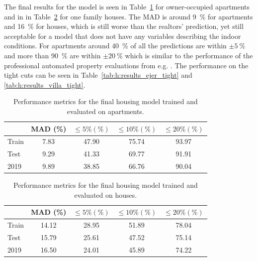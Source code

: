 The final results for the model is seen in Table~\ref{tab:h:results_ejer} for owner-occupied apartments and in in Table~\ref{tab:h:results_villa} for one family houses. The MAD is around \SI{9}{\percent} for apartments and \SI{16}{\percent} for houses, which is still worse than the realtors' prediction, yet still acceptable for a model that does not have any variables describing the indoor conditions. For apartments around \SI{40}{\percent} of all the predictions are within $\pm \SI{5}{\percent}$ and more than \SI{90}{\percent} are within $\pm \SI{20}{\percent}$ which is similar to the performance of the professional automated property evaluations from e.g. \citet{bolighedBolighedUsikkerhedDatavurderingen}. The performance on the tight cuts can be seen in Table~\ref{tab:h:results_ejer_tight} and \ref{tab:h:results_villa_tight}. 


\begin{table}
  \centerfloat
  \begin{tabular}{@{}lcccc@{}}
    {} &      MAD (\%) & $\leq 5\% (\%)$ &  $\leq 10\% (\%)$ &   $\leq 20\% (\%)$   \\
    \midrule
    Train & \num{7.83} & \num{47.90} & \num{75.74} & \num{93.97} \\
    Test  & \num{9.29} & \num{41.33} & \num{69.77} & \num{91.91} \\
    2019  & \num{9.89} & \num{38.85} & \num{66.76} & \num{90.04}    
  \end{tabular}
  \vspace{\abovecaptionskip}
  \caption[Performance Metrics for Apartments]{Performance metrics for the final housing model trained and evaluated on apartments.}
  \label{tab:h:results_ejer}
\end{table}


\begin{table}
  \centerfloat
  \begin{tabular}{@{}lcccc@{}}
    {} &      MAD (\%) & $\leq 5\% (\%)$ &  $\leq 10\% (\%)$ &   $\leq 20\% (\%)$    \\
    \midrule
    Train & \num{14.12} & \num{28.95} & \num{51.89} & \num{78.04}  \\
    Test  & \num{15.79} & \num{25.61} & \num{47.52} & \num{75.14}  \\
    2019  & \num{16.50} & \num{24.01} & \num{45.89} & \num{74.22}     
  \end{tabular}
  \vspace{\abovecaptionskip}
  \caption[Performance Metrics for Houses]{Performance metrics for the final housing model trained and evaluated on houses.}
  \label{tab:h:results_villa}
\end{table}


